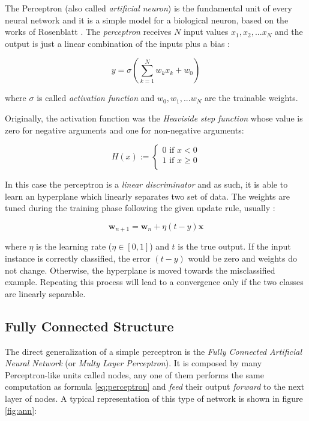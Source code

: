 \documentclass[12pt,a4paper]{report}
\begin{document}
The Perceptron (also called \textit{artificial neuron}) is the fundamental unit of every neural network and it is a simple model for a biological neuron, based on the works of Rosenblatt \cite{perceptron}. 
The \textit{perceptron} receives $N$ input values $x_1, x_2, ... x_N$ and the output is just a linear combination of the inputs plus a bias :

\begin{equation}
y = \sigma(\sum_{k=1}^N w_kx_k + w_0)
\end{equation}

where $\sigma$ is called \textit{activation function} and $w_0, w_1, ... w_N$ are the trainable weights.

Originally, the activation function was the \textit{Heaviside step function} whose value is zero for negative arguments and one for non-negative arguments: 

\begin{equation}
H(x) := 
\begin{cases}
  0 \text{ if } x < 0 \\ 
  1 \text{ if } x \geq 0 \\
\end{cases}
\end{equation}

In this case the perceptron is a \textit{linear discriminator} and as such, it is able to learn an hyperplane which linearly separates two set of data.
The weights are tuned during the training phase following the given update rule, usually :

\begin{equation}
 \bm{w}_{n+1} = \bm{w}_n + \eta (t - y)\bm{x}
 \label{eq:perceptron}
\end{equation}

where $\eta$ is the learning rate ($\eta \in [0,1]$) and $t$ is the true output. 
If the input instance is correctly classified,  the error $(t - y)$ would be zero and weights do not change. 
Otherwise, the hyperplane is moved towards the misclassified example. 
Repeating this process will lead to a convergence only if the two classes are linearly separable.  

\subsection*{Fully Connected Structure}

The direct generalization of a simple perceptron is the \textit{Fully Connected Artificial Neural Network} (or {\it Multy Layer Perceptron}). 
It is composed by many Perceptron-like units called nodes, any one of them performs the same computation as formula \ref{eq:perceptron} and \textit{feed} their output \textit{forward} to the next layer of nodes. 
A typical representation of this type of network is shown in figure \ref{fig:ann}:
\end{document}
